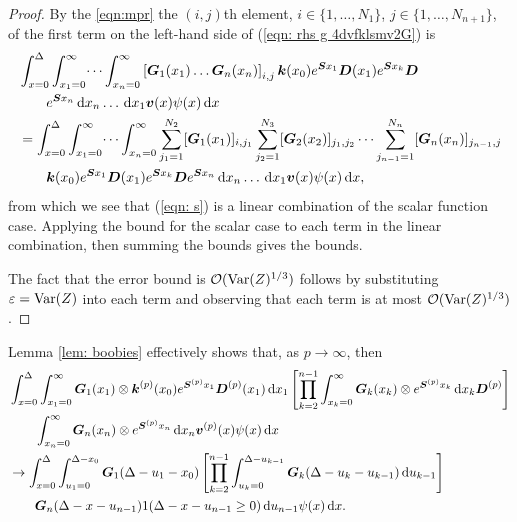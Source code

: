 \begin{proof}
	By the \ref{eqn:mpr} the \((i,j)\)th element, \(i\in\{1,\dots,N_1\}\), \(j\in\{1,\dots,N_{n+1}\}\), of the first term on the left-hand side of (\ref{eqn: rhs g 4dvfklsmv2G}) is 
	\begin{align}
		&\int_{x=0}^\Delta \int_{x_1=0}^\infty \dots \int_{x_n=0}^\infty \left[\boldsymbol G_1(x_1)\dots \boldsymbol G_n(x_n)\right]_{i,j} \boldsymbol k(x_0) e^{\boldsymbol{S}x_1} \boldsymbol D (x_1) 
		e^{\boldsymbol{S}x_k} \boldsymbol D \nonumber
		\\&\qquad{} e^{\boldsymbol{S}x_n} \, \mathrm{d} x_n \dots \, \mathrm{d} x_1 {\boldsymbol v}(x) \psi(x) \, \mathrm{d} x \nonumber 
		\\&= \int_{x=0}^\Delta \int_{x_1=0}^\infty \dots \int_{x_n=0}^\infty \sum_{j_1=1}^{N_2}[\boldsymbol G_1(x_1)]_{i,j_1}\sum_{j_2=1}^{N_3}[\boldsymbol G_2(x_2)]_{j_1,j_2}\dots \sum_{j_{n-1}=1}^{N_n} [\boldsymbol G_n(x_n)]_{j_{n-1},j} \nonumber
		\\&\qquad{} \boldsymbol k(x_0) e^{\boldsymbol{S}x_1} \boldsymbol D (x_1) 
		e^{\boldsymbol{S}x_k} \boldsymbol D 
		e^{\boldsymbol{S}x_n} \, \mathrm{d} x_n \dots \, \mathrm{d} x_1 {\boldsymbol v}(x) \psi(x) \, \mathrm{d} x, \label{eqn: s}
	\end{align}
	from which we see that (\ref{eqn: s}) is a linear combination of the scalar function case. Applying the bound for the scalar case to each term in the linear combination, then summing the bounds gives the bounds. 

	The fact that the error bound is \(\mathcal O(\mathrm{Var}(Z)^{1/3})\) follows by substituting \(\varepsilon=\mathrm{Var}(Z)\) into each term and observing that each term is at most \(\mathcal O(\mathrm{Var}(Z)^{1/3})\). 
\end{proof}
Lemma \ref{lem: boobies} effectively shows that, as \(p \to \infty\), then 
\begin{align}
	& \int_{x=0}^\Delta \int_{x_1=0}^\infty \bs G_1(x_1) \otimes \bs k^{(p)} (x_0) e^{\bs{S}^{(p)}x_1} \bs D^{(p)} (x_1) \wrt x_1
	\left[\prod_{k=2}^{n-1}\int_{x_k=0}^\infty \bs G_{k }(x_k) \otimes e^{\bs{S}^{(p)}x_k} \wrt x_k \bs D^{(p)}\right] \nonumber
\\&\qquad{}\int_{x_n=0}^\infty \bs G_{n }(x_n)\otimes e^{\bs{S}^{(p)}x_n} \wrt x_n {\bs v}^{(p)}(x) \psi(x) \wrt x \nonumber 
%
	\\&{}\to \int_{x=0}^\Delta \int_{u_1=0}^{\Delta-x_0}\bs G_1(\Delta - u_1 - x_0)
	\left[\prod_{k=2}^{n-1} \int_{u_k=0}^{\Delta-u_{k-1}} \bs G_{k}(\Delta-u_k-u_{k-1})\wrt u_{k-1}\right] \nonumber 
			\\&\qquad{} \bs G_{n }(\Delta - x-u_{n-1})
		1(\Delta-x-u_{n-1}\geq0) \wrt u_{n-1}\psi(x) \wrt x \nonumber.
\end{align}


